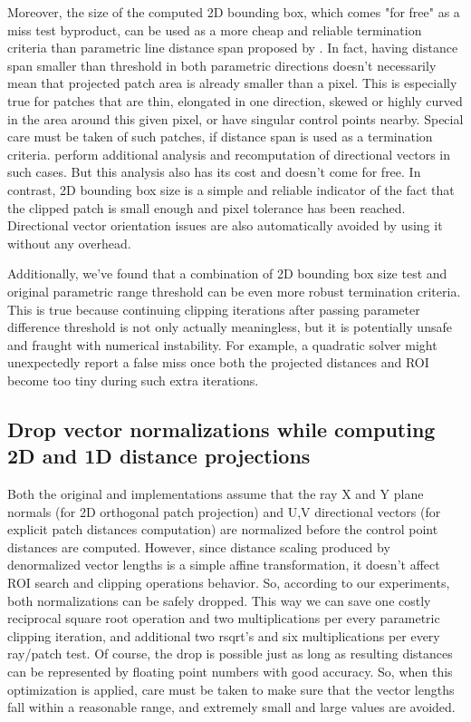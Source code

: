 \documentclass{jcgt}
\begin{document}
Moreover, the size of the computed 2D bounding box, which comes "for free" as a miss test byproduct, can be used as a more cheap and reliable termination criteria than parametric line distance span proposed by \cite{EFREMOV05}. In fact, having distance span smaller than threshold in both parametric directions doesn’t necessarily mean that projected patch area is already smaller than a pixel. %
This is especially true for patches that are thin, elongated in one direction, skewed or highly curved in the area around this given pixel, or have singular control points nearby. Special care must be taken of such patches, if distance span is used as a termination criteria. \cite{EFREMOV05} perform additional analysis and recomputation of directional vectors in such cases. But this analysis also has its cost and doesn’t come for free. In contrast, 2D bounding box size is a simple and reliable indicator of the fact that the clipped patch is small enough and pixel tolerance has been reached. Directional vector orientation issues are also automatically avoided by using it without any overhead.

Additionally, we’ve found that a combination of 2D bounding box size test and original parametric range threshold can be even more robust termination criteria. This is true because continuing clipping iterations after passing parameter difference threshold is not only actually meaningless, but it is potentially unsafe and fraught with numerical instability. For example, a quadratic solver might unexpectedly report a false miss once both the projected distances and ROI become too tiny during such extra iterations.

\subsection{Drop vector normalizations while computing 2D and 1D distance projections}
Both the original \cite{NISHITA90} and \cite{EFREMOV05} implementations assume that the ray X and Y plane normals (for 2D orthogonal patch projection) and U,V directional vectors (for explicit patch distances computation) are normalized before the control point distances are computed. However, since distance scaling produced by denormalized vector lengths is a simple affine transformation, it doesn’t affect ROI search and clipping operations behavior. So, according to our experiments, both normalizations can be safely dropped. This way we can save one costly reciprocal square root operation and two multiplications per every parametric clipping iteration, and additional two rsqrt’s and six multiplications per every ray/patch test. Of course, the drop is possible just as long as resulting distances can be represented by floating point numbers with good accuracy. So, when this optimization is applied, care must be taken to make sure that the vector lengths fall within a reasonable range, and extremely small and large values are avoided.
\end{document}
